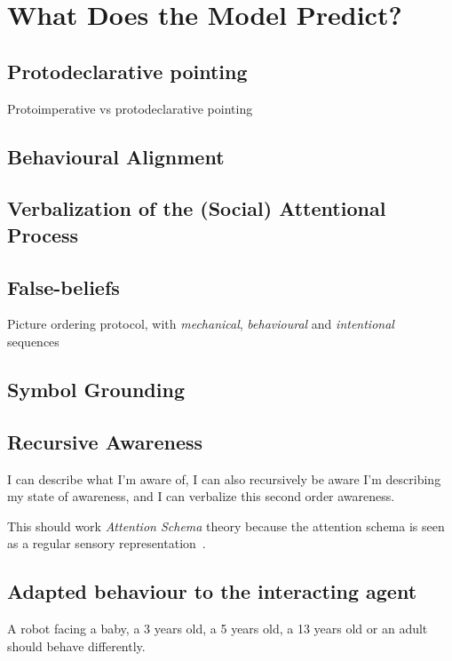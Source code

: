 \documentclass[a4paper]{article}
\begin{document}
\section{What Does the Model Predict?}

\subsection{Protodeclarative pointing}

Protoimperative vs protodeclarative pointing~\cite{baron1986perceptual}

\subsection{Behavioural Alignment}
\subsection{Verbalization of the (Social) Attentional Process}
\subsection{False-beliefs}


Picture ordering protocol, with \emph{mechanical}, \emph{behavioural} and
\emph{intentional} sequences~\cite{baron1986mechanical}

\subsection{Symbol Grounding}

\subsection{Recursive Awareness}

I can describe what I'm aware of, I can also recursively be aware I'm describing
my state of awareness, and I can verbalize this second order awareness.

This should work \emph{Attention Schema} theory because the attention schema
is seen as a regular sensory
representation~\citep[p.55]{graziano2013consciousness}.

\subsection{Adapted behaviour to the interacting agent}

A robot facing a baby, a 3 years old, a 5 years old, a 13 years old or an adult
should behave differently.
\end{document}
